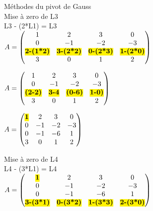 \vspace{10mm} %
Méthodes du pivot de Gauss \\

\vspace{10mm} %
Mise à zero de L3 \\
L3 - (2*L1) = L3 \\

$
A =
\begin{pmatrix}
  1 & 2 & 3 & 0 \\
  0 & -1 & -2 & -3 \\
  \hl{\textbf{2-(1*2)}} & \hl{\textbf{3-(2*2)}} & \hl{\textbf{0-(2*3)}} & \hl{\textbf{1-(2*0)}} \\
  3 & 0 & 1 & 2 \\
\end{pmatrix}
$

\vspace{5mm} %

$
A =
\begin{pmatrix}
  1 & 2 & 3 & 0 \\
  0 & -1 & -2 & -3 \\
  \hl{\textbf{(2-2)}} & \hl{\textbf{3-4}} & \hl{\textbf{(0-6)}} & \hl{\textbf{1-0)}} \\
  3 & 0 & 1 & 2 \\
\end{pmatrix}
$

\vspace{5mm} %

$
A =
\begin{pmatrix}
  \hl{\textbf{1}} & 2 & 3 & 0 \\
  0 & -1 & -2 & -3 \\
  0 & -1 & -6 & 1 \\
  3 & 0 & 1 & 2 \\
\end{pmatrix}
$

\vspace{10mm} %

Mise à zero de L4 \\
L4 - (3*L1) = L4 \\

$
A =
\begin{pmatrix}
  \hl{\textbf{1}} & 2 & 3 & 0 \\
  0 & -1 & -2 & -3 \\
  0 & -1 & -6 & 1 \\
  \hl{\textbf{3-(3*1)}} & \hl{\textbf{0-(3*2)}} & \hl{\textbf{1-(3*3)}} & \hl{\textbf{2-(3*0)}} \\
\end{pmatrix}
$

